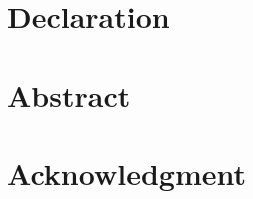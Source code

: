 \documentclass[12pt]{article}
\begin{document}



\begin{linenumbers}
\makeatletter
\patchcmd{\@startsection}{\@ifstar}{\nolinenumbers\@ifstar}{}{}
\patchcmd{\@xsect}{\ignorespaces}{\linenumbers\ignorespaces}{}{}
\makeatother

\section*{Declaration} \label{sec:declaration}

\newpage

\section*{Abstract} \label{sec:abstract}

\newpage

\section*{Acknowledgment} \label{sec:acknowledgement}

\newpage
\end{linenumbers}

\glsunsetall

\nolinenumbers

\tableofcontents
\newpage

\listoffigures
{}
\listoftables
\newpage


\glsresetall

\end{document}
